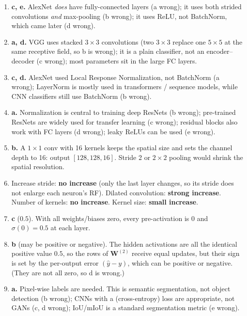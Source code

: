\documentclass[11pt,oneside]{article}
\begin{document}
\begin{enumerate}[label=\textbf{Q\arabic*.}, leftmargin=3em, itemsep=4pt]
  \item \textbf{c, e.} AlexNet \emph{does} have fully-connected layers (a wrong); it uses both
        strided convolutions \emph{and} max-pooling (b wrong); it uses ReLU, not BatchNorm, which came
        later (d wrong).
  \item \textbf{a, d.} VGG uses stacked $3\times3$ convolutions (two $3\times3$ replace one $5\times5$
        at the same receptive field, so b is wrong); it is a plain classifier, not an encoder--decoder
        (c wrong); most parameters sit in the large FC layers.
  \item \textbf{c, d.} AlexNet used Local Response Normalization, not BatchNorm (a wrong); LayerNorm is
        mostly used in transformers / sequence models, while CNN classifiers still use BatchNorm (b wrong).
  \item \textbf{a.} Normalization is central to training deep ResNets (b wrong); pre-trained ResNets are
        widely used for transfer learning (c wrong); residual blocks also work with FC layers (d wrong);
        leaky ReLUs can be used (e wrong).
  \item \textbf{b.} A $1\times1$ conv with 16 kernels keeps the spatial size and sets the channel depth to
        16: output $[128,128,16]$. Stride 2 or $2\times2$ pooling would shrink the spatial resolution.
  \item Increase stride: \textbf{no increase} (only the last layer changes, so its stride does not enlarge
        each neuron's RF). Dilated convolution: \textbf{strong increase}. Number of kernels:
        \textbf{no increase}. Kernel size: \textbf{small increase}.
  \item \textbf{c} ($0.5$). With all weights/biases zero, every pre-activation is $0$ and
        $\sigma(0)=0.5$ at each layer.
  \item \textbf{b} (may be positive or negative). The hidden activations are all the identical positive
        value $0.5$, so the rows of $\mathbf{W}^{(2)}$ receive equal updates, but their sign is set by the
        per-output error $(\hat y-y)$, which can be positive or negative. (They are not all zero, so d is wrong.)
  \item \textbf{a.} Pixel-wise labels are needed. This is semantic segmentation, not object detection
        (b wrong); CNNs with a (cross-entropy) loss are appropriate, not GANs (c, d wrong); IoU/mIoU is a
        standard segmentation metric (e wrong).

\end{enumerate}
\end{document}
